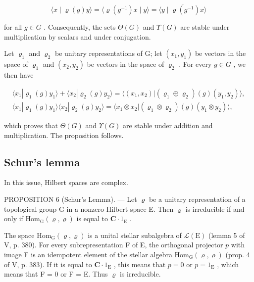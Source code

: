\[
\langle x \mid \varrho (g) y \rangle = \langle \varrho (g ^ {- 1}) x \mid y \rangle = \overline {{\langle y \mid \varrho (g ^ {- 1}) x \rangle}}
\]

for all \(g \in G\) . Consequently, the sets \(\Theta(G)\) and \(\Upsilon(G)\) are stable under multiplication by scalars and under conjugation.

Let \(\varrho_{1}\) and \(\varrho_{2}\) be unitary representations of G; let \((x_{1}, y_{1})\) be vectors in the space of \(\varrho_{1}\) and \((x_{2}, y_{2})\) be vectors in the space of \(\varrho_{2}\) . For every \(g \in G\) , we then have

\[
\begin{array}{c} \langle x _ {1}   |   \varrho_ {1} (g) y _ {1} \rangle + \langle x _ {2}   |   \varrho_ {2} (g) y _ {2} \rangle = \langle (x _ {1}, x _ {2})   |   (\varrho_ {1} \oplus \varrho_ {2}) (g) (y _ {1}, y _ {2}) \rangle , \\ \langle x _ {1}   |   \varrho_ {1} (g) y _ {1} \rangle \langle x _ {2}   |   \varrho_ {2} (g) y _ {2} \rangle = \langle x _ {1} \otimes x _ {2}   |   (\varrho_ {1} \otimes \varrho_ {2}) (g) (y _ {1} \otimes y _ {2}) \rangle , \end{array}
\]

which proves that \(\Theta(G)\) and \(\Upsilon(G)\) are stable under addition and multiplication. The proposition follows.

\subsection{Schur's lemma}

In this issue, Hilbert spaces are complex.

PROPOSITION 6 (Schur's Lemma). --- Let \(\varrho\) be a unitary representation of a topological group G in a nonzero Hilbert space E. Then \(\varrho\) is irreducible if and only if \(\mathrm{Hom}_{\mathrm{G}}(\varrho, \varrho)\) is equal to \(\mathbf{C} \cdot 1_{\mathrm{E}}\) .

The space \(\mathrm{Hom}_{\mathrm{G}}(\varrho, \varrho)\) is a unital stellar subalgebra of \(\mathcal{L}(\mathrm{E})\) (lemma 5 of V, p. 380). For every subrepresentation F of E, the orthogonal projector \(p\) with image F is an idempotent element of the stellar algebra \(\mathrm{Hom}_{\mathrm{G}}(\varrho, \varrho)\) (prop. 4 of V, p. 383). If it is equal to \(\mathbf{C} \cdot 1_{\mathrm{E}}\) , this means that \(p = 0\) or \(p = 1_{\mathrm{E}}\) , which means that F = 0 or F = E. Thus \(\varrho\) is irreducible.

